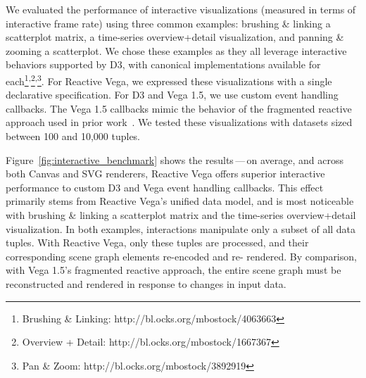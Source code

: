 We evaluated the performance of interactive visualizations (measured in terms of
interactive frame rate) using three common examples: brushing \& linking a
scatterplot matrix, a time-series overview+detail visualization, and panning \&
zooming a scatterplot. We chose these examples as they all leverage interactive
behaviors supported by D3, with canonical implementations available for
each\footnote{Brushing \& Linking:
http://bl.ocks.org/mbostock/4063663}\textsuperscript{,}\footnote{Overview +
Detail: http://bl.ocks.org/mbostock/1667367}\textsuperscript{,}\footnote{Pan \&
Zoom: http://bl.ocks.org/mbostock/3892919}. For Reactive Vega, we expressed
these visualizations with a single declarative specification. For D3 and Vega
1.5, we use custom event handling callbacks. The Vega 1.5 callbacks mimic the
behavior of the fragmented reactive approach used in prior
work~\cite{satyanarayan:declarative}. We tested these visualizations with
datasets sized between 100 and 10,000 tuples.

Figure~\ref{fig:interactive_benchmark} shows the results\,---\,on average, and
across both Canvas and SVG renderers, Reactive Vega offers superior interactive
performance to custom D3 and Vega event handling callbacks. This effect
primarily stems from Reactive Vega's unified data model, and is most noticeable
with brushing \& linking a scatterplot matrix and the time-series
overview+detail visualization. In both examples, interactions manipulate only a
subset of all data tuples. With Reactive Vega, only these tuples are processed,
and their corresponding scene graph elements re-encoded and re- rendered. By
comparison, with Vega 1.5's fragmented reactive approach, the entire scene graph
must be reconstructed and rendered in response to changes in input data.